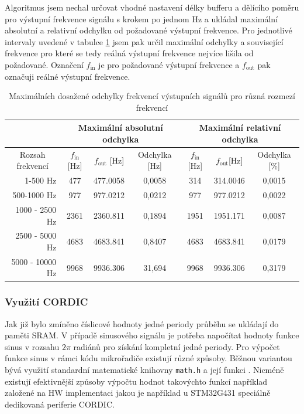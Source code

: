  Algoritmus jsem nechal určovat vhodné nastavení délky bufferu a dělícího poměru pro výstupní frekvence signálu s krokem po jednom Hz a ukládal maximální absolutní a relativní odchylku od požadované výstupní frekvence. Pro jednotlivé intervaly uvedené v tabulce \ref{tab:OptimalizaceFrekvence} jsem pak určil maximální odchylky a související frekvence pro které se tedy reálná výstupní frekvence nejvíce lišila od požadované. Označení $f_\text{in}$ je pro požadované výstupní frekvence a $f_\text{out}$ pak označuji reálné výstupní frekvence. 
 \begin{table}[H]

	\begin{tabular}{r|ccc|ccc}
		\multicolumn{1}{c|}{}                 & \multicolumn{3}{c|}{Maximální absolutní odchylka} & \multicolumn{3}{c}{Maximální relativní odchylka} \\ \hline
		\multicolumn{1}{c|}{Rozsah frekvencí} & $f_\text{in}${[}Hz{]}  & $f_\text{out}$ {[}Hz{]}  & Odchylka {[}Hz{]}  & $f_\text{in}${[}Hz{]} & $f_\text{out}${[}Hz{]} & Odchylka {[}\%{]} \\ \hline
		1-500 Hz                              & 477       & 477.0058         & 0,0058             & 314               & 314.0046 & 0,0015            \\
		500-1000 Hz                           & 977       & 977.0212         & 0,0212             & 977               & 977.0212 & 0,0022            \\
		1000 - 2500 Hz                        & 2361      & 2360.811         & 0,1894             & 1951              & 1951.171 & 0,0087            \\
		2500 - 5000 Hz                        & 4683      & 4683.841         & 0,8407             & 4683              & 4683.841 & 0,0179            \\
		5000 - 10000 Hz                       & 9968      & 9936.306         & 31,694             & 9968              & 9936.306 & 0,3179           
	\end{tabular}
 	\caption{Maximálních dosažené odchylky frekvencí výstupních signálů pro různá rozmezí frekvencí }
 	\label{tab:OptimalizaceFrekvence}
 \end{table}
 
\subsubsection*{Využití CORDIC}
Jak již bylo zmíněno číslicové hodnoty jedné periody průběhu se ukládají do paměti SRAM. V případě sinusového signálu je potřeba napočítat hodnoty funkce sinus v rozsahu $2\pi$ radiánů pro získání kompletní jedné periody. Pro výpočet funkce sinus v rámci kódu mikrořadiče existují různé způsoby. Běžnou variantou bývá využití standardní matematické knihovny \texttt{math.h} a její funkci . Nicméně existují efektivnější způsoby výpočtu hodnot takovýchto funkcí například založené na HW implementaci jakou je například u STM32G431 speciálně dedikovaná periferie CORDIC.\\

